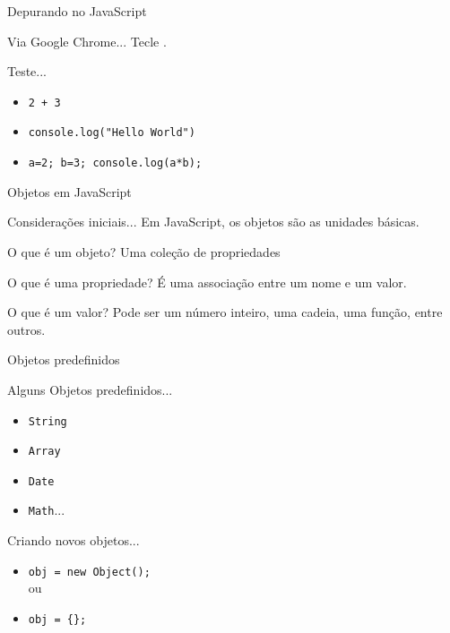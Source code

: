 \documentclass[xcolor=dvipsnames,table]{beamer}
\begin{document}
\begin{frame}{Depurando no JavaScript}
	\begin{block}{Via Google Chrome...}
		Tecle .
	\end{block} 
	\begin{block}{Teste...}
		\begin{itemize}
			\item {\tt 2 + 3}
			\item {\tt console.log("Hello World")}
			\item {\tt a=2; b=3; console.log(a*b);}
		\end{itemize}
	\end{block}
\end{frame}

\begin{frame}{Objetos em JavaScript}
	\begin{block}{Considerações iniciais...}
		Em JavaScript, os objetos são as unidades básicas.
	\end{block} 
	\begin{block}{O que é um objeto?}
		Uma coleção de propriedades	
	\end{block} 
	\begin{block}{O que é uma propriedade?}
		É uma associação entre um nome e um valor.
	\end{block}
	\begin{block}{O que é um valor?}
		Pode ser um número inteiro, uma cadeia, uma função, entre outros.
	\end{block}
\end{frame}

\begin{frame}{Objetos predefinidos}
	\begin{block}{Alguns Objetos predefinidos...}
		\begin{itemize}
			\item {\tt String}
			\item {\tt Array}
			\item {\tt Date}
			\item {\tt Math}...
		\end{itemize}
	\end{block} 
	\begin{block}{Criando novos objetos...}
		\begin{itemize}
			\item {\tt obj = new Object();}
			\\ou
			\item {\tt obj = \{\};}
		\end{itemize}
	\end{block}
\end{frame}
\end{document}
